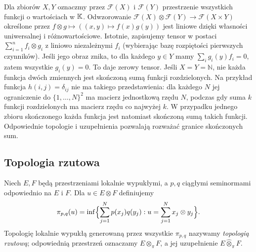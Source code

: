 \begin{przyklad}
\label{ex:separable-functions24}
Dla zbiorów $X,Y$ oznaczmy przez $\mathcal F(X)$
i $\mathcal F(Y)$ przestrzenie wszystkich funkcji o
wartościach w $\mathbb K$. Odwzorowanie
$\mathcal F(X)\otimes\mathcal F(Y)\to\mathcal F(X\times Y)$
określone przez $f\otimes g\mapsto ((x,y)\mapsto f(x)g(y))$
jest liniowe dzięki własności uniwersalnej i różnowartościowe.
Istotnie, zapisujemy tensor w postaci $\sum_{i=1}^n f_i\otimes g_i$
z liniowo niezależnymi $f_i$ (wybierając bazę rozpiętości
pierwszych czynników). Jeśli jego obraz znika, to dla
każdego $y\in Y$ mamy $\sum_i g_i(y)f_i=0$, zatem
wszystkie $g_i(y)=0$. To daje zerowy tensor.
Jeśli $X=Y=\mathbb N$, nie każda funkcja dwóch zmiennych
jest skończoną sumą funkcji rozdzielonych. Na przykład
funkcja $h(i,j)=\delta_{ij}$ nie ma takiego przedstawienia:
dla każdego $N$ jej ograniczenie do $\{1,\ldots,N\}^2$
ma macierz jednostkową rzędu $N$, podczas gdy suma $k$
funkcji rozdzielonych ma macierz rzędu co najwyżej $k$.
W przypadku jednego zbioru skończonego każda funkcja
jest natomiast skończoną sumą takich funkcji. Odpowiednie
topologie i uzupełnienia pozwalają rozważać granice
skończonych sum.
\end{przyklad}

\subsection{Topologia rzutowa}

\begin{definicja}
\label{def:pi-seminorm24}
Niech $E,F$ będą przestrzeniami lokalnie wypukłymi, a $p,q$
ciągłymi seminormami odpowiednio na $E$ i $F$. Dla
$u\in E\otimes F$ definiujemy
\[
 \pi_{p,q}(u)=\inf\Bigl\{\sum_{j=1}^N p(x_j)q(y_j):
 u=\sum_{j=1}^Nx_j\otimes y_j\Bigr\}.
\]
Topologię lokalnie wypukłą generowaną przez wszystkie
$\pi_{p,q}$ nazywamy \emph{topologią rzutową};
odpowiednią przestrzeń oznaczamy $E\otimes_\pi F$,
a jej uzupełnienie $E\widehat\otimes_\pi F$.
\end{definicja}

